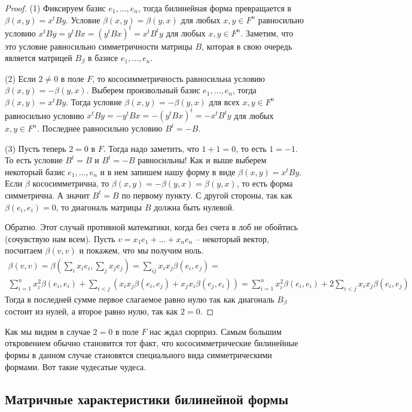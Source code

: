 \begin{proof}
(1) Фиксируем базис $e_1,\ldots,e_n$, тогда билинейная форма превращается в $\beta(x,y) = x^t B y$. Условие $\beta(x,y) = \beta(y,x)$ для любых $x,y\in F^n$ равносильно условию $x^t B y = y^t B x = (y^t B x)^t = x^t B^t y$ для любых $x,y\in F^n$. Заметим, что это условие равносильно симметричности матрицы $B$, которая в свою очередь является матрицей $B_\beta$ в базисе $e_1,\ldots,e_n$.

(2) Если $2\neq 0$ в поле $F$, то кососимметричность равносильна условию $\beta(x,y) = -\beta(y,x)$. Выберем произвольный базис $e_1,\ldots,e_n$, тогда $\beta(x,y) = x^t By$. Тогда условие $\beta(x,y) = -\beta(y,x)$ для всех $x,y\in F^n$ равносильно условию $x^t By = -y^t Bx = -(y^t B x)^t =- x^t B^t y$ для любых $x,y\in F^n$. Последнее равносильно условию $B^t = - B$.

(3) Пусть теперь $2 = 0$ в $F$. Тогда надо заметить, что $1 + 1 = 0$, то есть $1 = - 1$. То есть условие $B^t = B$ и $B^t = - B$ равносильны! Как и выше выберем некоторый базис $e_1,\ldots,e_n$ и в нем запишем нашу форму в виде $\beta(x,y) = x^t B y$. Если $\beta$ кососимметрична, то $\beta(x,y) = -\beta(y,x) = \beta(y,x)$, то есть форма симметрична. А значит $B^t = B$ по первому пункту. С другой стороны, так как $\beta(e_i,e_i) = 0$, то диагональ матрицы $B$ должна быть нулевой.

Обратно. Этот случай противной математики, когда без счета в лоб не обойтись (сочувствую нам всем). Пусть $v = x_1e_1+\ldots+x_ne_n$ -- некоторый вектор, посчитаем $\beta(v,v)$ и покажем, что мы получим ноль.
\begin{gather*}
\beta(v,v) = \beta(\sum_i x_i e_i, \sum_j x_j e_j) = \sum_{ij}x_ix_j \beta(e_i,e_j) =\\ \sum_{i=1}^nx_i^2 \beta(e_i, e_i) + \sum_{i<j}(x_i x_j \beta(e_i, e_j) + x_j x_i \beta(e_j, e_i)) = \sum_{i=1}^nx_i^2 \beta(e_i, e_i) + 2\sum_{i<j}x_i x_j \beta(e_i, e_j)
\end{gather*}
Тогда в последней сумме первое слагаемое равно нулю так как диагональ $B_\beta$ состоит из нулей, а второе равно нулю, так как $2 = 0$.
\end{proof}

Как мы видим в случае $2 = 0$ в поле $F$ нас ждал сюрприз. Самым большим откровением обычно становится тот факт, что кососимметрические билинейные формы в данном случае становятся специального вида симметрическими формами. Вот такие чудесатые чудеса.

\subsection{Матричные характеристики билинейной формы}\label{subsection::BilChar}

